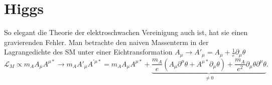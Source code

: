 \chapter{Higgs}
So elegant die Theorie der elektroschwachen Vereinigung auch ist, hat sie einen gravierenden Fehler.
Man betrachte den naiven Massenterm in der Lagrangedichte des SM unter einer Eichtransformation $A_\mu \rightarrow A'_\mu = A_\mu + \frac{1}{e}\partial_\mu\theta$
\begin{equation*}
	\mathcal{L}_M \propto m_A A_\mu A^{\mu*}\longrightarrow m_A A'_\mu A^{'\mu*} = m_A A_\mu A^{\mu*} + \underbrace{\frac{m_A}{e}(A_\mu\partial^\mu\theta + A^{\mu*}\partial_\mu\theta) + \frac{m_A}{e^2}\partial_\mu\theta\partial^\mu\theta}_{\neq 0}.
\end{equation*}

